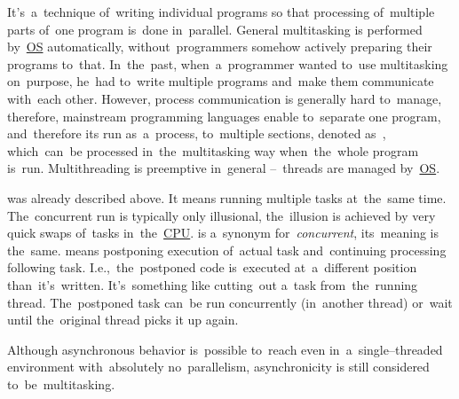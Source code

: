 \label{multithreading}
It's~a~technique of~writing individual programs so that processing of~multiple parts of~one program is~done in~parallel.
General multitasking is performed by~\hyperref[os]{OS} automatically, without~programmers somehow actively preparing their programs to~that.
In~the~past, when~a~programmer wanted to~use multitasking on~purpose, he~had to~write multiple programs and~make them communicate with~each other.
However, process communication is generally hard to~manage, therefore, mainstream programming languages enable to~separate one program, and~therefore its run as~a~process, to~multiple sections, denoted as~, which~can~be processed in~the~multitasking way when~the~whole program is~run.
Multithreading is preemptive in~general --~threads are managed by~\hyperref[os]{OS}.
\newline

\label{concurrentparallelasynchronous}
\begin{itemize}
     was already described above.
            It means running multiple tasks at~the~same time.
            The~concurrent run is typically only illusional, the~illusion is achieved by very quick swaps of~tasks in~the~\hyperref[processorcpucore]{CPU}.
     is a~synonym for~\textit{concurrent}, its~meaning is the~same.
     means postponing execution of~actual task and~continuing processing following task.
            I.e.,~the~postponed code is~executed at~a~different position than~it's~written.
            It's~something like cutting~out a~task from~the~running thread.
            The~postponed task can~be run concurrently (in~another thread) or~wait until the~original thread picks it up again.
\end{itemize}

\note Although asynchronous behavior is~possible to~reach even in~a~single--threaded environment with~absolutely no~parallelism, asynchronicity is still considered to~be~multitasking.
\newline
